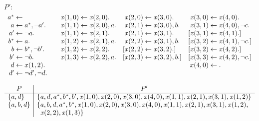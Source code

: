 \begin{Loesung}%
\rm
\begin{UList}
\item $P':{}$
\begin{equation*}
\begin{array}[t]{r@{{}\leftarrow{}}l@{\qquad}r@{{}\leftarrow{}}l@{\quad}r@{{}\leftarrow{}}l@{\quad}r@{{}\leftarrow{}}l}
a^* &
&
\mathit{x}(1,0) & \mathit{x}(2,0).
&
\mathit{x}(2,0) & \mathit{x}(3,0).
&
\mathit{x}(3,0) & \mathit{x}(4,0).
\\
a & a^*, \neg a'. %
&
\mathit{x}(1,1) & \mathit{x}(2,0), a.
&
\mathit{x}(2,1) & \mathit{x}(3,0), b.
&
\mathit{x}(3,1) & \mathit{x}(4,0), \neg c.
\\
a' & \neg{a}.
&
\mathit{x}(1,1) & \mathit{x}(2,1).
&
\mathit{x}(2,1) & \mathit{x}(3,1).
&
[\mathit{x}(3,1) & \mathit{x}(4,1).]
\\
b^* & a.
&
\mathit{x}(1,2) & \mathit{x}(2,1), a.
&
\mathit{x}(2,2) & \mathit{x}(3,1), b.
&
[\mathit{x}(3,2) & \mathit{x}(4,1), \neg c.]
\\
b & b^*, \neg b'.
&
\mathit{x}(1,2) & \mathit{x}(2,2).
&
[\mathit{x}(2,2) & \mathit{x}(3,2).]
&
[\mathit{x}(3,2) & \mathit{x}(4,2).]
\\
b' &    \neg b.
&
\mathit{x}(1,3) & \mathit{x}(2,2), a.
&
[\mathit{x}(2,3) & \mathit{x}(3,2), b.]
&
[\mathit{x}(3,3) & \mathit{x}(4,2), \neg c.]
\\
d & x(1,2).
& \multicolumn{5}{r@{{}\leftarrow{}}}{x(4,0)} & .%
\\
d' & \neg d', \neg d.
\end{array}
\end{equation*}


\item
\begin{equation*}
\begin{array}{l|l}
\multicolumn{1}{c|}{P} & \multicolumn{1}{c}{P'}
\\\hline
\{a,d\}
&
\{a,d,a^*,b^*,b',\mathit{x}(1,0),\mathit{x}(2,0),\mathit{x}(3,0),\mathit{x}(4,0),\mathit{x}(1,1),\mathit{x}(2,1),
\mathit{x}(3,1),\mathit{x}(1,2)\}
\\
\{a,b,d\}
&
\{a,b,d,a^*,b^*,\mathit{x}(1,0),\mathit{x}(2,0),\mathit{x}(3,0),\mathit{x}(4,0),\mathit{x}(1,1),\mathit{x}(2,1),
\mathit{x}(3,1),\mathit{x}(1,2), %
\\
&
\phantom{\{}\mathit{x}(2,2),\mathit{x}(1,3)\}
\end{array}
\end{equation*}
\end{UList}
\newpage
\end{Loesung}

